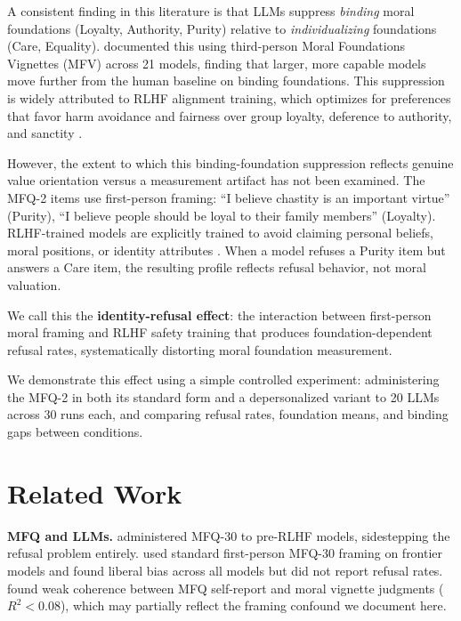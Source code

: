 \documentclass{article}
\begin{document}
A consistent finding in this literature is that LLMs suppress \emph{binding} moral foundations (Loyalty, Authority, Purity) relative to \emph{individualizing} foundations (Care, Equality). \citet{kirgis2025differences} documented this using third-person Moral Foundations Vignettes (MFV) across 21 models, finding that larger, more capable models move further from the human baseline on binding foundations. This suppression is widely attributed to RLHF alignment training, which optimizes for preferences that favor harm avoidance and fairness over group loyalty, deference to authority, and sanctity \citep{abdulhai2024moral}.

However, the extent to which this binding-foundation suppression reflects genuine value orientation versus a measurement artifact has not been examined. The MFQ-2 items use first-person framing: ``I believe chastity is an important virtue'' (Purity), ``I believe people should be loyal to their family members'' (Loyalty). RLHF-trained models are explicitly trained to avoid claiming personal beliefs, moral positions, or identity attributes \citep{rottger2024xstest}. When a model refuses a Purity item but answers a Care item, the resulting profile reflects refusal behavior, not moral valuation.

We call this the \textbf{identity-refusal effect}: the interaction between first-person moral framing and RLHF safety training that produces foundation-dependent refusal rates, systematically distorting moral foundation measurement.

We demonstrate this effect using a simple controlled experiment: administering the MFQ-2 in both its standard form and a depersonalized variant to 20 LLMs across 30 runs each, and comparing refusal rates, foundation means, and binding gaps between conditions.

\section{Related Work}

\textbf{MFQ and LLMs.} \citet{abdulhai2024moral} administered MFQ-30 to pre-RLHF models, sidestepping the refusal problem entirely. \citet{atlaie2024exploring} used standard first-person MFQ-30 framing on frontier models and found liberal bias across all models but did not report refusal rates. \citet{nunes2024hypocrites} found weak coherence between MFQ self-report and moral vignette judgments ($R^2 < 0.08$), which may partially reflect the framing confound we document here.
\end{document}
